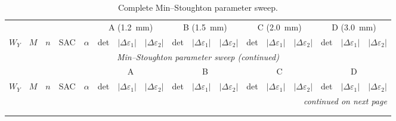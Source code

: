 \begingroup\scriptsize
\setlength{\tabcolsep}{2.6pt}
\begin{longtable}{c c c c c c c c c c c c c c c c c }
\toprule
 & & & & & \multicolumn{3}{c}{A (\SI{1.2}{\milli\meter})} & \multicolumn{3}{c}{B (\SI{1.5}{\milli\meter})} & \multicolumn{3}{c}{C (\SI{2.0}{\milli\meter})} & \multicolumn{3}{c}{D (\SI{3.0}{\milli\meter})}\\
\cmidrule(lr){6-8}\cmidrule(lr){9-11}\cmidrule(lr){12-14}\cmidrule(lr){15-17}
$W_Y$ & $M$ & $n$ & SAC & $\alpha$ & det & $|\Delta\varepsilon_1|$ & $|\Delta\varepsilon_2|$ & det & $|\Delta\varepsilon_1|$ & $|\Delta\varepsilon_2|$ & det & $|\Delta\varepsilon_1|$ & $|\Delta\varepsilon_2|$ & det & $|\Delta\varepsilon_1|$ & $|\Delta\varepsilon_2|$\\
\midrule
\endfirsthead
\multicolumn{17}{c}{\emph{Min--Stoughton parameter sweep (continued)}}\\
\toprule
 & & & & & \multicolumn{3}{c}{A} & \multicolumn{3}{c}{B} & \multicolumn{3}{c}{C} & \multicolumn{3}{c}{D}\\
\cmidrule(lr){6-8}\cmidrule(lr){9-11}\cmidrule(lr){12-14}\cmidrule(lr){15-17}
$W_Y$ & $M$ & $n$ & SAC & $\alpha$ & det & $|\Delta\varepsilon_1|$ & $|\Delta\varepsilon_2|$ & det & $|\Delta\varepsilon_1|$ & $|\Delta\varepsilon_2|$ & det & $|\Delta\varepsilon_1|$ & $|\Delta\varepsilon_2|$ & det & $|\Delta\varepsilon_1|$ & $|\Delta\varepsilon_2|$\\
\midrule
\endhead
\midrule
\multicolumn{17}{r}{\emph{continued on next page}}\\
\endfoot
\bottomrule
\caption[Complete Min--Stoughton parameter sweep]{Complete Min--Stoughton parameter sweep.}\label{tab:ms_sweep_full}\\
\endlastfoot


\end{longtable}
